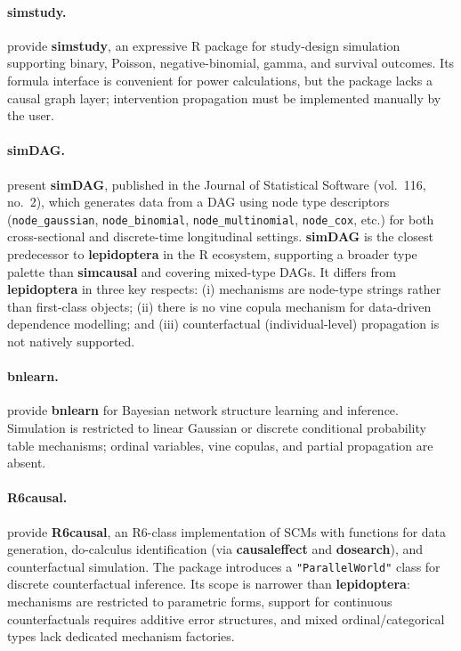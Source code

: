 \documentclass[12pt,a4paper]{article}
\newcommand{\pkg}[1]{\textbf{#1}}
\newcommand{\code}[1]{\texttt{#1}}
\newcommand{\proglang}[1]{\textsf{#1}}
\newcommand{\class}[1]{\mbox{\texttt{"#1"}}}
\begin{document}
\paragraph{\pkg{simstudy}.}
\citet{goldfeld2020simstudy} provide \pkg{simstudy}, an expressive \proglang{R}
package for study-design simulation supporting binary, Poisson, negative-binomial,
gamma, and survival outcomes. Its formula interface is convenient for power
calculations, but the package lacks a causal graph layer; intervention propagation
must be implemented manually by the user.

\paragraph{\pkg{simDAG}.}
\citet{denz2026simdag} present \pkg{simDAG}, published in the Journal of Statistical
Software (vol.~116, no.~2), which generates data from a DAG using node type
descriptors (\code{node\_gaussian}, \code{node\_binomial}, \code{node\_multinomial},
\code{node\_cox}, etc.) for both cross-sectional and discrete-time longitudinal
settings. \pkg{simDAG} is the closest predecessor to \pkg{lepidoptera} in the
\proglang{R} ecosystem, supporting a broader type palette than \pkg{simcausal} and
covering mixed-type DAGs. It differs from \pkg{lepidoptera} in three key respects:
(i) mechanisms are node-type strings rather than first-class objects; (ii) there is
no vine copula mechanism for data-driven dependence modelling; and (iii)
counterfactual (individual-level) propagation is not natively supported.

\paragraph{\pkg{bnlearn}.}
\citet{scutari2010bnlearn} provide \pkg{bnlearn} for Bayesian network structure
learning and inference. Simulation is restricted to linear Gaussian or discrete
conditional probability table mechanisms; ordinal variables, vine copulas, and
partial propagation are absent.

\paragraph{\pkg{R6causal}.}
\citet{tikka2024r6causal} provide \pkg{R6causal}, an R6-class implementation of
SCMs with functions for data generation, do-calculus identification (via
\pkg{causaleffect} and \pkg{dosearch}), and counterfactual simulation. The package
introduces a \class{ParallelWorld} class for discrete counterfactual inference.
Its scope is narrower than \pkg{lepidoptera}: mechanisms are restricted to
parametric forms, support for continuous counterfactuals requires additive error
structures, and mixed ordinal/categorical types lack dedicated mechanism factories.
\end{document}
